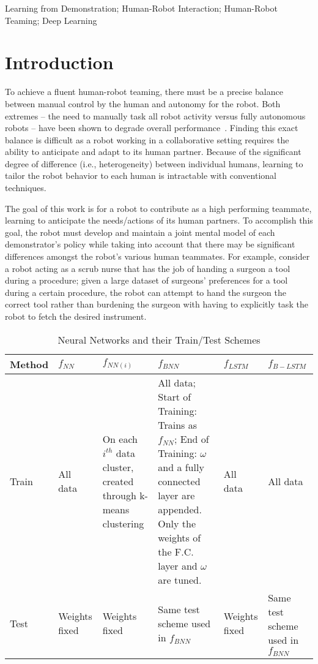 \documentclass[conference]{IEEEtran}
\begin{document}
\begin{IEEEkeywords}
Learning from Demonstration; Human-Robot Interaction; Human-Robot Teaming; Deep Learning
\end{IEEEkeywords}

\section{Introduction}
\par To achieve a fluent human-robot teaming, there must be a precise balance between manual control by the human and autonomy for the robot. Both extremes -- the need to manually task all robot activity versus fully autonomous robots -- have been shown to degrade overall performance~\cite{Chen:2012,844354}. Finding this exact balance is difficult as a robot working in a collaborative setting requires the ability to anticipate and adapt to its human partner. Because of the significant degree of difference (i.e., heterogeneity) between individual humans, learning to tailor the robot behavior to each human is intractable with conventional techniques.

\par The goal of this work is for a robot to contribute as a high performing teammate, learning to anticipate the needs/actions of its human partners. To accomplish this goal, the robot must develop and maintain a joint mental model of each demonstrator's policy while taking into account that there may be significant differences amongst the robot's various human teammates. For example, consider a robot acting as a scrub nurse that has the job of handing a surgeon a tool during a procedure; given a large dataset of surgeons' preferences for a tool during a certain procedure, the robot can attempt to hand the surgeon the correct tool rather than burdening the surgeon with having to explicitly task the robot to fetch the desired instrument.

\begin{table*}[t]
  \centering
\begin{tabular}{|p{.8cm}|p{.8cm}|p{3.5cm}|p{6.2cm}|p{.8cm}|p{2cm}|}
\hline
Method & $f_{NN}$ & $f_{NN(i)}$  & $f_{BNN}$ &  $f_{LSTM}$    & $f_{B-LSTM}$                       \\ \hline
Train  & All data  & On each $\textit{i}^{th}$  data cluster, created through k-means clustering \cite{Nikolaidis:2015:EML:2696454.2696455} 
& All data; Start of Training: Trains as $f_{NN}$; End of Training: $\omega$ and a fully connected layer are appended. Only the weights of the F.C. layer and $\omega$ are tuned. & All data      & All data     \\ \hline
Test   & Weights fixed & Weights fixed  &                                                                                        Same test scheme used in $f_{BNN}$                                                                  & Weights fixed & Same test scheme used in $f_{BNN}$ \\ \hline
\end{tabular}
\title{}
  \caption{Neural Networks and their Train/Test Schemes}
  \label{tab:1}
  \vspace{-6mm}
\end{table*}
\end{document}
